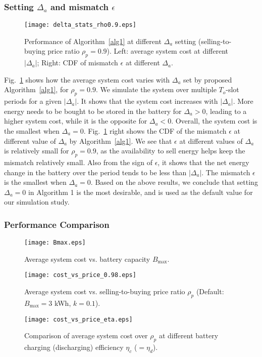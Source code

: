 \documentclass[journal]{IEEEtran}
\begin{document}
\subsubsection{Setting $\Delta_a$ and mismatch $\epsilon$}
\begin{figure}[t]
\centering
\texttt{[image: delta\_stats\_rho0.9.eps]}
\caption{\small  Performance of Algorithm~\ref{alg1}  at different  $\Delta_a$ setting (selling-to-buying price ratio $\rho_p=0.9$). Left: average system cost at different $|\Delta_a|$; Right: CDF of mismatch $\epsilon$ at different $\Delta_a$. }
\label{fig:delta}
\end{figure}
Fig.~\ref{fig:delta} shows how the average system cost  varies with  $\Delta_a$ set by proposed Algorithm~\ref{alg1}, for $\rho_p=0.9$. We simulate the system over multiple  $T_o$-slot periods for a given $|\Delta_a|$. It shows that the system cost increases with $|\Delta_a|$. More energy needs to be bought to be stored in the battery for $\Delta_a>0$,  leading to a higher system cost, while it is the opposite for $\Delta_a<0$. Overall, the system cost is the smallest when $\Delta_a=0$.  Fig.~\ref{fig:delta} right shows the CDF of the mismatch $\epsilon$ at different value of   $\Delta_a$ by Algorithm~\ref{alg1}. We see that $\epsilon$ at different values of $\Delta_a$ is relatively small for $\rho_p=0.9$, as the availability to sell energy helps keep the mismatch  relatively small. Also from the sign of $\epsilon$, it shows that the net energy change in the battery over the period tends to be less than $|\Delta_a|$.  The mismatch $\epsilon$ is the smallest when $\Delta_a=0$. Based on the above results, we conclude that  setting $\Delta_a= 0$ in  Algorithm 1 is the most desirable, and is used as the default value for our simulation study.

\subsubsection{Performance Comparison}
\begin{figure}[t]
\centering
\texttt{[image: Bmax.eps]}
\caption{\small Average system cost vs. battery capacity $B_{\max}$.}
\label{fig:Ymax}
\centering
\texttt{[image: cost\_vs\_price\_0.98.eps]}
\caption{\small Average system cost vs. selling-to-buying price ratio $\rho_p$ (Default: $B_{\max}=3$ kWh, $k=0.1$).}
\label{fig:percents_vs_cost}
\centering
\texttt{[image: cost\_vs\_price\_eta.eps]}
\caption{\small Comparison of average system cost over $\rho_p$ at different battery charging (discharging) efficiency $\eta_c$ ($=\eta_d$).}
\label{fig:cost_vs_eta}
\end{figure}
\end{document}
